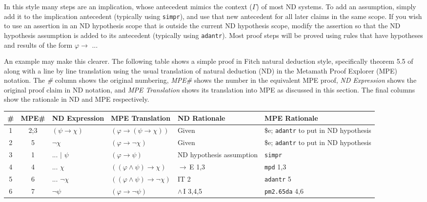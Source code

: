 In this style many steps are an implication, whose antecedent mimics
the context ($\Gamma$) of most ND systems. To add an assumption, simply add
it to the implication antecedent (typically using
\texttt{simpr}),
and use that
new antecedent for all later claims in the same scope. If you wish to
use an assertion in an ND hypothesis scope that is outside the current
ND hypothesis scope, modify the assertion so that the ND hypothesis
assumption is added to its antecedent (typically using \texttt{adantr}). Most
proof steps will be proved using rules that have hypotheses and results
of the form $\varphi \rightarrow$ ...

An example may make this clearer.
The following table shows a simple proof in Fitch natural deduction style,
specifically theorem 5.5 of
\cite[p.~18]{Clemente}
along with a line by line translation using the usual
translation of natural deduction (ND) in the Metamath Proof Explorer
(MPE) notation.
The \textit{\#} column shows the original numbering,
\textit{MPE\#} shows the number in the equivalent MPE proof,
\textit{ND Expression} shows the original proof claim in ND notation,
and \textit{MPE Translation} shows its translation into MPE
as discussed in this section.
The final columns show the rationale in ND and MPE respectively.

{\setlength{\extrarowsep}{4pt} %
\begin{longtabu}   { @{} c c X X X X }
\textbf{\#} & \textbf{MPE\#} & \textbf{ND Ex\-pres\-sion} &
\textbf{MPE Trans\-lation} & \textbf{ND Ration\-ale} &
\textbf{MPE Ra\-tio\-nale} \\
\endhead

1 & 2;3 &
$( \psi \rightarrow \chi )$ &
$( \varphi \rightarrow ( \psi \rightarrow \chi ) )$ &
Given &
\$e; \texttt{adantr} to put in ND hypothesis \\

2 & 5 &
$ \lnot \chi$ &
$( \varphi \rightarrow \lnot \chi )$ &
Given &
\$e; \texttt{adantr} to put in ND hypothesis \\

3 & 1 &
... $\vert$ $\psi$ &
$( \varphi \rightarrow \psi )$ &
ND hypothesis assumption &
\texttt{simpr} \\

4 & 4 &
... $\chi$ &
$( ( \varphi \land \psi ) \rightarrow \chi )$ &
$\rightarrow$\,E 1,3 &
\texttt{mpd} 1,3 \\

5 & 6 &
... $\lnot \chi$ &
$( ( \varphi \land \psi ) \rightarrow \lnot \chi )$ &
IT 2 &
\texttt{adantr} 5 \\

6 & 7 &
$\lnot \psi$ &
$( \varphi \rightarrow \lnot \psi )$ &
$\land$\,I 3,4,5 &
\texttt{pm2.65da} 4,6 \\

\end{longtabu}
}


